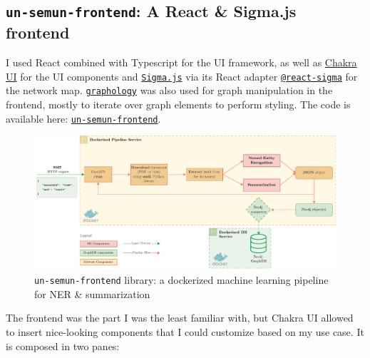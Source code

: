 
\subsection{\texttt{un-semun-frontend}: A React \& Sigma.js frontend} \label{ssec:un-semun-frontend-a-react-sigma-js-frontend}

I used React combined with Typescript for the UI framework, as well as \href{https://chakra-ui.com/}{Chakra UI} for the UI components and \href{https://www.sigmajs.org/}{\texttt{Sigma.js}} via its React adapter \href{https://sim51.github.io/react-sigma/}{\texttt{@react-sigma}} for the network map. \href{https://graphology.github.io/}{\texttt{graphology}} was also used for graph manipulation in the frontend, mostly to iterate over graph elements to perform styling. The code is available here: \href{https://github.com/ClementSicard/un-semun-frontend}{\faGithub{} \texttt{un-semun-frontend}}.


\begin{figure}[!htb]
    \centering

    \includegraphics[width=\textwidth]{res/ml-pipeline.pdf}
    \caption{\texttt{un-semun-frontend} library: a dockerized machine learning pipeline for NER \& summarization}

    \label{fig:frontend-screenshot}
\end{figure}


The frontend was the part I was the least familiar with, but Chakra UI allowed to insert nice-looking components that I could customize based on my use case. It is composed in two panes:

